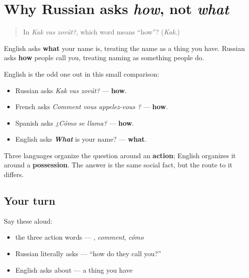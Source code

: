 \section[\texorpdfstring{\ru{как} / comment … (kak / comment …)}{как / comment … (kak / comment …)}]{Why Russian asks \emph{how}, not \emph{what}}

\label{lesson:RU-C02-kak-cross-language}



\begin{quote}
In \emph{Kak vas zovút?}, which word means \textquotedblleft{}how\textquotedblright{}? (\emph{Kak}.)
\end{quote}

\begin{grammarlens}[title={Grammar Lens: one question, two ways to organize it}]
English asks \textbf{what} your name is, treating the name as a thing you have. Russian asks \textbf{how} people call you, treating naming as something people do.

English is the odd one out in this small comparison:

\begin{itemize}
\raggedright
  \item Russian asks \emph{Kak vas zovút?} — \textbf{how}.
  \item French asks \emph{Comment vous appelez-vous ?} — \textbf{how}.
  \item Spanish asks \emph{¿Cómo se llama?} — \textbf{how}.
  \item English asks \emph{\textbf{What}} is your name? — \textbf{what}.
\end{itemize}

Three languages organize the question around an \textbf{action}; English organizes it around a \textbf{possession}. The answer is the same social fact, but the route to it differs.
\end{grammarlens}

\subsection*{Your turn}
Say these aloud:

\begin{itemize}
\raggedright
  \item the three action words — \emph{}, \emph{comment}, \emph{cómo}
  \item Russian literally asks — \textquotedblleft{}how do they call you?\textquotedblright{}
  \item English asks about — a thing you have
\end{itemize}

